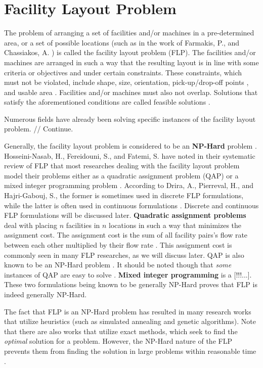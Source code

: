 \section{Facility Layout Problem}
The problem of arranging a set of facilities and/or machines in a pre-determined area, or a set of possible locations (such as in the work of Farmakis, P., and Chassiakos, A. \cite{Farmakis2018}) is called the facility layout problem (FLP). The facilities and/or machines are arranged in such a way that the resulting layout is in line with some criteria or objectives and under certain constraints. These constraints, which must not be violated, include shape, size, orientation, pick-up/drop-off points \cite{Hosseini-Nasab2018}, and usable area \cite{Fernando2015}. Facilities and/or machines must also not overlap. Solutions that satisfy the aforementioned conditions are called feasible solutions \cite{Meller1996}.

Numerous fields have already been solving specific instances of the facility layout problem. // Continue.

Generally, the facility layout problem is considered to be an \textbf{NP-Hard} problem \cite{Drira2007}. Hosseini-Nasab, H., Fereidouni, S., and Fatemi, S. have noted in their systematic review of FLP that most researches dealing with the facility layout problem model their problems either as a quadratic assignment problem (QAP) or a mixed integer programming problem \cite{Hosseini-Nasab2018}. According to Drira, A., Pierreval, H., and Hajri-Gabouj, S., the former is sometimes used in discrete FLP formulations, while the latter is often used in continuous formulations \cite{Drira2007}. Discrete and continuous FLP formulations will be discussed later. \textbf{Quadratic assignment problems} deal with placing $n$ facilities in $n$ locations in such a way that minimizes the assignment cost. The assignment cost is the sum of all facility pairs's flow rate between each other multiplied by their flow rate \cite{QAPDefinition}. This assignment cost is commonly seen in many FLP researches, as we will discuss later. QAP is also known to be an NP-Hard problem \cite{Garey1979}. It should be noted though that \textit{some} instances of QAP are easy to solve \cite{Feizollahi2015}. \textbf{Mixed integer programming} is a [!!!...]. These two formulations being known to be generally NP-Hard proves that FLP is indeed generally NP-Hard.

The fact that FLP is an NP-Hard problem has resulted in many research works that utilize heuristics (such as simulated annealing and genetic algorithms). Note that there are also works that utilize exact methods, which seek to find the \textit{optimal} solution for a problem. However, the NP-Hard nature of the FLP prevents them from finding the solution in large problems within reasonable time \cite{Asl2015}.

